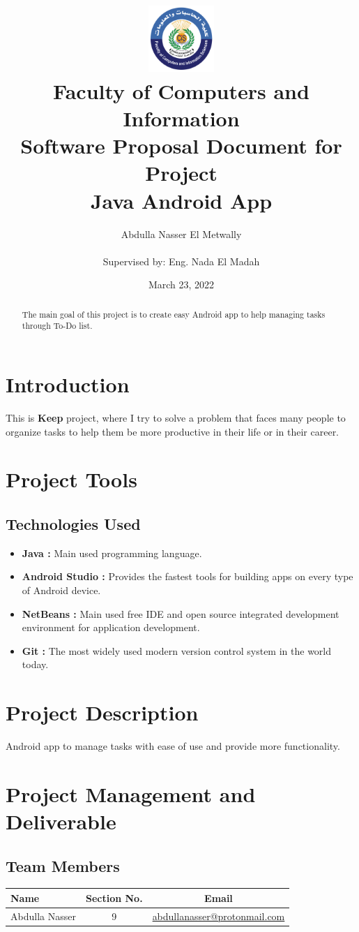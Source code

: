 \documentclass[12pt]{article}
\title{
{\includegraphics[width=3cm, height=2.5cm]{images/faculty_logo.png}}\\
{\large Faculty of Computers and Information}\\
{\textbf{Software Proposal Document for Project \\ Java Android App}}
}
\author{Abdulla Nasser El Metwally \\ \\
Supervised by: Eng. Nada El Madah}
\date{March 23, 2022}
\begin{document}
\maketitle

\begin{abstract}
The main goal of this project is to create easy Android app to help managing tasks through To-Do list.

\end{abstract}

\section{Introduction}
This is \textbf{Keep} project, where I try to solve a problem that faces many people to organize tasks to help them be more productive in their life or in their career.

\section{Project Tools}
\subsection{Technologies Used}
\begin{itemize}
    \item \textbf{Java : } Main used programming language.
    \item \textbf{Android Studio : } Provides the fastest tools for building apps on every type of Android device.
    \item \textbf{NetBeans : } Main used free IDE and open source integrated development environment for application development.
    \item \textbf{Git : } The most widely used modern version control system in the world today.
\end{itemize}

\section{Project Description}
Android app to manage tasks with ease of use and provide more functionality.

\section{Project Management and Deliverable}
\subsection{Team Members}

\hfill

\begin{center}
\begin{tabular}{ |l|c|c| } 
\hline
\textbf{Name} & \textbf{Section No.} & \textbf{Email} \\ 
\hline
\hline
Abdulla Nasser & 9 & \href{mailto:abdullanasser@protonmail.com}{abdullanasser@protonmail.com} \\ 
\hline
\end{tabular}
\end{center}
\end{document}
